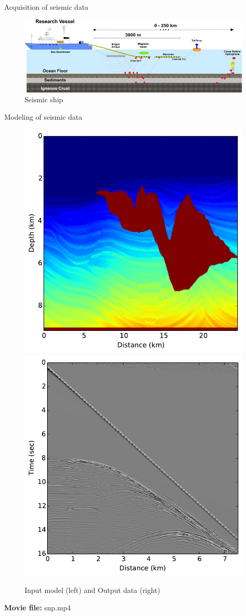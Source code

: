\documentclass[xcolor=dvipsnames,notes]{beamer}
\begin{document}
\begin{frame}{Acquisition of seismic data}
\begin{figure}
  \includegraphics[width=\linewidth]{Fig/seismic-ship.jpg}
  \caption{Seismic ship}
  \label{fig:ship}
\end{figure}
\end{frame}
\begin{frame}{Modeling of seismic data}
\begin{figure}
  \includegraphics[width=0.4\linewidth]{Fig/vp.pdf}
  \includegraphics[width=0.4\linewidth]{Fig/data.pdf}
  \caption{Input model (left) and Output data (right)}
\end{figure}
{\bf Movie file:} snp.mp4
\end{frame}
\end{document}
